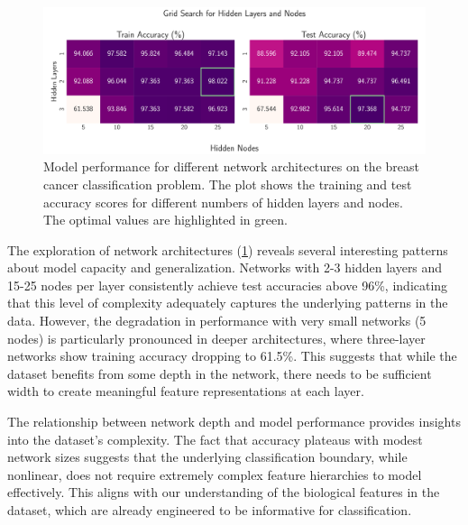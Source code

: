 \onecolumngrid
\begin{figure}[h!]
    \begin{minipage}{\textwidth}
        \centering
        \includegraphics[width = .9\textwidth]{../figs/classification_hidden_layers_nodes.pdf}
        \caption{Model performance for different network architectures on the breast cancer classification problem. The plot shows the training and test accuracy scores for different numbers of hidden layers and nodes. The optimal values are highlighted in green.}
        \label{fig:NN_Classification_hidden_layers_nodes}
    \end{minipage}
\end{figure}
\twocolumngrid

The exploration of network architectures (\cref{fig:NN_Classification_hidden_layers_nodes}) reveals several interesting patterns about model capacity and generalization. Networks with 2-3 hidden layers and 15-25 nodes per layer consistently achieve test accuracies above 96\%, indicating that this level of complexity adequately captures the underlying patterns in the data. However, the degradation in performance with very small networks (5 nodes) is particularly pronounced in deeper architectures, where three-layer networks show training accuracy dropping to 61.5\%. This suggests that while the dataset benefits from some depth in the network, there needs to be sufficient width to create meaningful feature representations at each layer.

The relationship between network depth and model performance provides insights into the dataset's complexity. The fact that accuracy plateaus with modest network sizes suggests that the underlying classification boundary, while nonlinear, does not require extremely complex feature hierarchies to model effectively. This aligns with our understanding of the biological features in the dataset, which are already engineered to be informative for classification.

